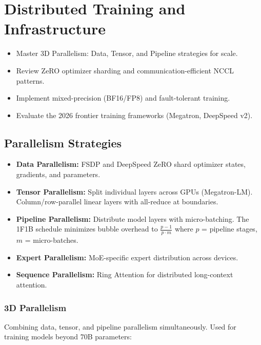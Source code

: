 \chapter{Distributed Training and Infrastructure}
\minitoc

\begin{chapteroverview}
  \begin{itemize}
    \item Master 3D Parallelism: Data, Tensor, and Pipeline strategies for scale.
    \item Review ZeRO optimizer sharding and communication-efficient NCCL patterns.
    \item Implement mixed-precision (BF16/FP8) and fault-tolerant training.
    \item Evaluate the 2026 frontier training frameworks (Megatron, DeepSpeed v2).
  \end{itemize}
\end{chapteroverview}

\section{Parallelism Strategies}

\begin{itemize}
  \item \textbf{Data Parallelism:} FSDP and DeepSpeed ZeRO shard optimizer states, gradients, and parameters.
  \item \textbf{Tensor Parallelism:} Split individual layers across GPUs (Megatron-LM). Column/row-parallel linear layers with all-reduce at boundaries.
  \item \textbf{Pipeline Parallelism:} Distribute model layers with micro-batching. The 1F1B schedule minimizes bubble overhead to $\frac{p-1}{p \cdot m}$ where $p$ = pipeline stages, $m$ = micro-batches.
  \item \textbf{Expert Parallelism:} MoE-specific expert distribution across devices.
  \item \textbf{Sequence Parallelism:} Ring Attention for distributed long-context attention.
\end{itemize}

\subsection{3D Parallelism}

Combining data, tensor, and pipeline parallelism simultaneously. Used for training models beyond 70B parameters:

